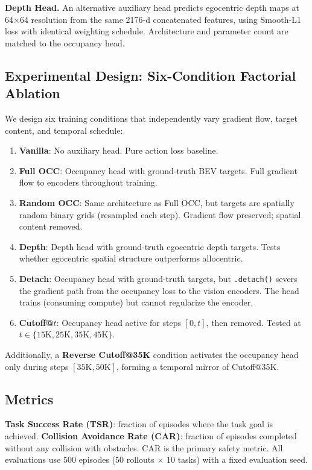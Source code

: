 \documentclass[10pt,twocolumn]{article}
\begin{document}
\textbf{Depth Head.}\quad
An alternative auxiliary head predicts egocentric depth maps at 64$\times$64 resolution from the same 2176-d concatenated features, using Smooth-L1 loss with identical weighting schedule.
Architecture and parameter count are matched to the occupancy head.

\subsection{Experimental Design: Six-Condition Factorial Ablation}
\label{sec:conditions}

We design six training conditions that independently vary gradient flow, target content, and temporal schedule:

\begin{enumerate}
\item \textbf{Vanilla}: No auxiliary head. Pure action loss baseline.
\item \textbf{Full OCC}: Occupancy head with ground-truth BEV targets. Full gradient flow to encoders throughout training.
\item \textbf{Random OCC}: Same architecture as Full OCC, but targets are spatially random binary grids (resampled each step). Gradient flow preserved; spatial content removed.
\item \textbf{Depth}: Depth head with ground-truth egocentric depth targets. Tests whether egocentric spatial structure outperforms allocentric.
\item \textbf{Detach}: Occupancy head with ground-truth targets, but \texttt{.detach()} severs the gradient path from the occupancy loss to the vision encoders. The head trains (consuming compute) but cannot regularize the encoder.
\item \textbf{Cutoff@$t$}: Occupancy head active for steps $[0, t]$, then removed. Tested at $t \in \{15\text{K}, 25\text{K}, 35\text{K}, 45\text{K}\}$.
\end{enumerate}

Additionally, a \textbf{Reverse Cutoff@35K} condition activates the occupancy head only during steps $[35\text{K}, 50\text{K}]$, forming a temporal mirror of Cutoff@35K.

\subsection{Metrics}

\textbf{Task Success Rate (TSR)}: fraction of episodes where the task goal is achieved.
\textbf{Collision Avoidance Rate (CAR)}: fraction of episodes completed without any collision with obstacles.
CAR is the primary safety metric.
All evaluations use 500 episodes (50 rollouts $\times$ 10 tasks) with a fixed evaluation seed.
\end{document}

